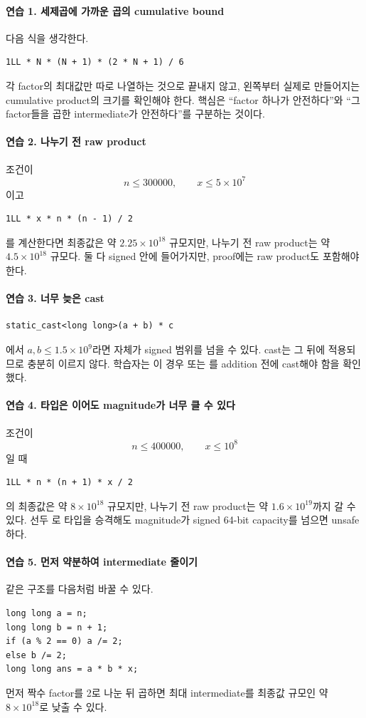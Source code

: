 \paragraph{연습 1. 세제곱에 가까운 곱의 cumulative bound}
다음 식을 생각한다.
\begin{lstlisting}
1LL * N * (N + 1) * (2 * N + 1) / 6
\end{lstlisting}
각 factor의 최대값만 따로 나열하는 것으로 끝내지 않고, 왼쪽부터 실제로 만들어지는 cumulative product의 크기를 확인해야 한다. 핵심은 ``factor 하나가 안전하다''와 ``그 factor들을 곱한 intermediate가 안전하다''를 구분하는 것이다.

\paragraph{연습 2. 나누기 전 raw product}
조건이
\[
n\le300000,\qquad x\le5\times10^7
\]
이고
\begin{lstlisting}
1LL * x * n * (n - 1) / 2
\end{lstlisting}
를 계산한다면 최종값은 약 $2.25\times10^{18}$ 규모지만, 나누기 전 raw product는 약 $4.5\times10^{18}$ 규모다. 둘 다 signed  안에 들어가지만, proof에는 raw product도 포함해야 한다.

\paragraph{연습 3. 너무 늦은 cast}
\begin{lstlisting}
static_cast<long long>(a + b) * c
\end{lstlisting}
에서 $a,b\le1.5\times10^9$라면  자체가 signed  범위를 넘을 수 있다. cast는 그 뒤에 적용되므로 충분히 이르지 않다. 학습자는 이 경우  또는 를 addition 전에 cast해야 함을 확인했다.

\paragraph{연습 4. 타입은 이어도 magnitude가 너무 클 수 있다}
조건이
\[
n\le400000,\qquad x\le10^8
\]
일 때
\begin{lstlisting}
1LL * n * (n + 1) * x / 2
\end{lstlisting}
의 최종값은 약 $8\times10^{18}$ 규모지만, 나누기 전 raw product는 약 $1.6\times10^{19}$까지 갈 수 있다. 선두 로 타입을 승격해도 magnitude가 signed 64-bit capacity를 넘으면 unsafe하다.

\paragraph{연습 5. 먼저 약분하여 intermediate 줄이기}
같은 구조를 다음처럼 바꿀 수 있다.
\begin{lstlisting}
long long a = n;
long long b = n + 1;
if (a % 2 == 0) a /= 2;
else b /= 2;
long long ans = a * b * x;
\end{lstlisting}
먼저 짝수 factor를 2로 나눈 뒤 곱하면 최대 intermediate를 최종값 규모인 약 $8\times10^{18}$로 낮출 수 있다.

